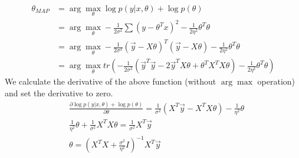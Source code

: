 \begin{answer}\\
\begin{align*}
    \theta_{MAP} &= \arg\max\limits_\theta \log p(y|x, \theta) + \log p(\theta)\\
    &= \arg\max\limits_\theta -\frac{1}{2\sigma^2} \sum(y - \theta^T x)^2 - \frac{1}{2\eta^2} \theta^T\theta\\
    &= \arg\max\limits_\theta -\frac{1}{2\sigma^2} (\vec{y} - X\theta)^T (\vec{y} - X\theta) - \frac{1}{2\eta^2} \theta^T\theta\\
    &=\arg\max\limits_\theta tr(-\frac{1}{2\sigma^2}(\vec{y}^T \vec{y} - 2\vec{y}^T X \theta + \theta^T X^T X \theta) - \frac{1}{2\eta^2} \theta^T\theta)
\end{align*}
We calculate the derivative of the above function (without $\arg\max$ operation) and set the derivative to zero.
\begin{align*}
    &\frac{\partial \log p(y|x, \theta) + \log p(\theta)}{\partial \theta} = \frac{1}{\sigma^2} (X^T \vec{y} - X^T X \theta) - \frac{1}{\eta^2}\theta\\
    &\frac{1}{\eta^2}\theta + \frac{1}{\sigma^2} X^T X \theta = \frac{1}{\sigma^2}X^T \vec{y}\\
    &\theta = (X^T X + \frac{\sigma^2}{\eta^2}I)^{-1} X^T \vec{y}
\end{align*}
\end{answer}
